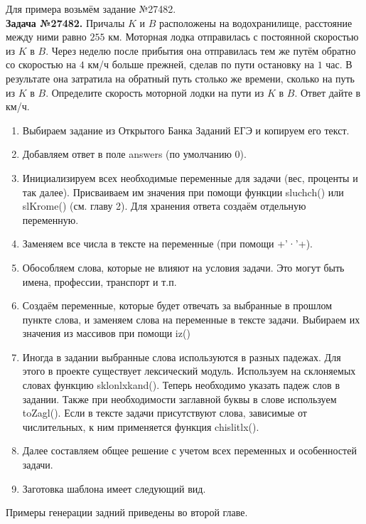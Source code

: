 Для примера возьмём задание №27482.
\\
\textbf{Задача №27482.}
Причалы $K$ и $B$ расположены на водохранилище, расстояние между ними равно $255$ км. Моторная лодка отправилась с постоянной скоростью из $K$ в $B$. Через неделю после прибытия она отправилась тем же путём обратно со скоростью на $4$ км/ч больше прежней, сделав по пути остановку на $1$ час. В результате она затратила на обратный путь столько же времени, сколько на путь из $K$ в $B$. Определите скорость моторной лодки на пути из $K$ в $B$. Ответ дайте в км/ч.\\ 

\begin{enumerate}
    \item Выбираем задание из Открытого Банка Заданий ЕГЭ и копируем его текст.
    \item Добавляем ответ в поле answers (по умолчанию 0).
    \item Инициализируем всех необходимые переменные для задачи (вес, проценты и так далее). Присваиваем им значения при помощи функции sluchch() или slKrome() (см. главу 2). Для хранения ответа создаём отдельную переменную.
    \item Заменяем все числа в тексте на переменные (при помощи +’·’+). 
    \item Обособляем слова, которые не влияют на условия задачи. Это могут быть имена, профессии, транспорт и т.п. 
    \item Создаём переменные, которые будет отвечать за выбранные в прошлом пункте слова, и заменяем слова на переменные в тексте задачи. Выбираем их значения из массивов при помощи iz()
    \item Иногда в задании выбранные слова используются в разных падежах. Для этого в проекте существует лексический модуль. Используем на склоняемых словах функцию sklonlxkand(). Теперь необходимо указать падеж слов в задании. Также при необходимости заглавной буквы в слове используем toZagl(). Если в тексте задачи присутствуют слова, зависимые от числительных, к ним применяется функция chislitlx().
    \item Далее составляем общее решение с учетом всех переменных и особенностей задачи.
    \item Заготовка шаблона имеет следующий вид.
     
\end{enumerate}

Примеры генерации задний приведены во второй главе.

